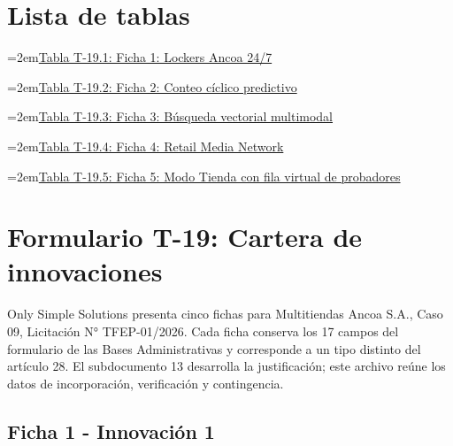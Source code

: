 \documentclass[11pt]{article}
\begin{document}
\renewcommand{\tablename}{Tabla}
\renewcommand{\thetable}{T-19.\arabic{table}}



\tableofcontents
\clearpage
\section*{Lista de tablas}

\noindent\hangindent=2em\hyperref[tab:t19-1]{Tabla T-19.1: Ficha 1: Lockers Ancoa 24/7}\dotfill\pageref{tab:t19-1}\par\vspace{0.4\baselineskip}
\noindent\hangindent=2em\hyperref[tab:t19-2]{Tabla T-19.2: Ficha 2: Conteo cíclico predictivo}\dotfill\pageref{tab:t19-2}\par\vspace{0.4\baselineskip}
\noindent\hangindent=2em\hyperref[tab:t19-3]{Tabla T-19.3: Ficha 3: Búsqueda vectorial multimodal}\dotfill\pageref{tab:t19-3}\par\vspace{0.4\baselineskip}
\noindent\hangindent=2em\hyperref[tab:t19-4]{Tabla T-19.4: Ficha 4: Retail Media Network}\dotfill\pageref{tab:t19-4}\par\vspace{0.4\baselineskip}
\noindent\hangindent=2em\hyperref[tab:t19-5]{Tabla T-19.5: Ficha 5: Modo Tienda con fila virtual de probadores}\dotfill\pageref{tab:t19-5}\par\vspace{0.4\baselineskip}
\clearpage


\section*{Formulario T-19: Cartera de innovaciones}\label{formulario-t-19-cartera-de-innovaciones}

Only Simple Solutions presenta cinco fichas para Multitiendas Ancoa S.A., Caso 09, Licitación N° TFEP-01/2026. Cada ficha conserva los 17 campos del formulario de las Bases Administrativas y corresponde a un tipo distinto del artículo 28. El subdocumento 13 desarrolla la justificación; este archivo reúne los datos de incorporación, verificación y contingencia.

\subsection*{Ficha 1 - Innovación 1}\label{ficha-1-innovaciuxf3n-1}
\end{document}
